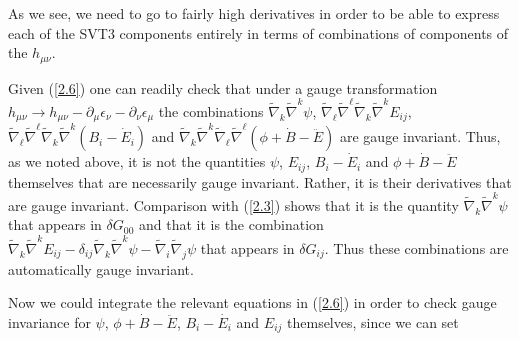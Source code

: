%
As we see, we need to go to fairly high derivatives in order to be able to express each of the SVT3 components entirely in terms of combinations of components of the $h_{\mu\nu}$.

Given (\ref{2.6}) one can readily check that under a gauge transformation $h_{\mu\nu}\rightarrow h_{\mu\nu}-\partial_{\mu}\epsilon_{\nu}-\partial_{\nu}\epsilon_{\mu}$ the combinations  $\tilde{\nabla}_k\tilde{\nabla}^k\psi $, $\tilde{\nabla}_{\ell}\tilde{\nabla}^{\ell}\tilde{\nabla}_k\tilde{\nabla}^kE_{ij}$, $\tilde{\nabla}_{\ell}\tilde{\nabla}^{\ell}\tilde{\nabla}_k\tilde{\nabla}^k(B_i-\dot{E}_i)$ and $ \tilde{\nabla}_k\tilde{\nabla}^k\tilde{\nabla}_{\ell}\tilde{\nabla}^{\ell}(\phi+\dot{B}-\ddot{E})$ are gauge invariant. Thus, as we noted above, it is not the quantities $\psi$, $E_{ij}$, $B_i-\dot{E}_i$ and $\phi+\dot{B}-\ddot{E}$ themselves that are necessarily gauge invariant. Rather, it is their derivatives that are  gauge invariant. Comparison with (\ref{2.3}) shows that it is the quantity $\tilde{\nabla}_k\tilde{\nabla}^k\psi$ that appears in $\delta G_{00}$ and that it is the combination $ \tilde{\nabla}_k\tilde{\nabla}^kE_{ij}-\delta_{ij}\tilde{\nabla}_k\tilde{\nabla}^k\psi-\tilde{\nabla}_i\tilde{\nabla}_j\psi$ that appears in  $\delta G_{ij}$. Thus these  combinations are automatically gauge invariant.


Now we could integrate the relevant equations in (\ref{2.6}) in order to check gauge invariance for $\psi$, $\phi+\dot{B}-\ddot{E}$, $B_{i}-\dot{E_i}$ and $E_{ij}$ themselves, since we can set

